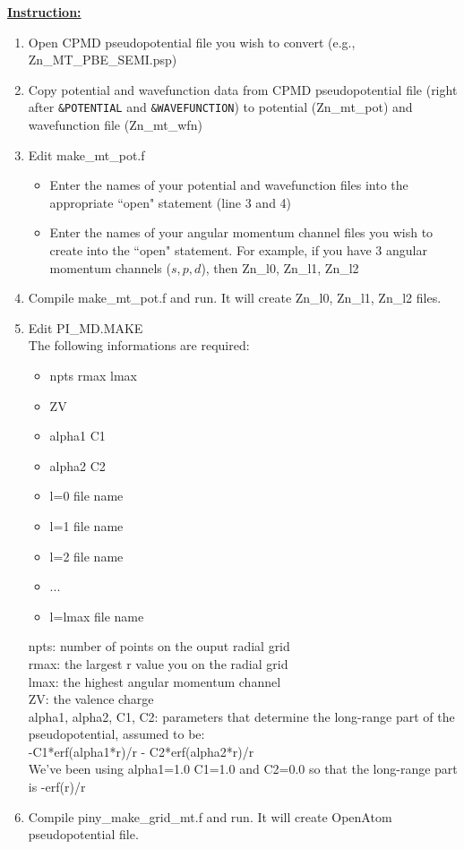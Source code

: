 \vskip 12pt
\noindent
\underline{ {\bf Instruction:} }

\begin{enumerate}
\item Open CPMD pseudopotential file you wish to convert (e.g., Zn\_MT\_PBE\_SEMI.psp)
\item  Copy potential and wavefunction data from CPMD pseudopotential file (right after \verb+&POTENTIAL+ and \verb+&WAVEFUNCTION+) to potential (Zn{\_}mt{\_}pot) and wavefunction file (Zn\_mt\_wfn)
\item Edit make{\_}mt{\_}pot.f

        \begin{itemize}
	\item Enter the names of your potential and wavefunction files into the appropriate ``open" statement (line 3 and 4)
	\item Enter the names of your angular momentum channel files  you wish to create into the ``open" statement. 
	For example, if you have 3 angular momentum channels ($s, p, d$), then Zn{\_}l0, Zn{\_}l1, Zn{\_}l2
         \end{itemize}

\item Compile make{\_}mt{\_}pot.f and run. It will create Zn{\_}l0, Zn{\_}l1, Zn{\_}l2 files.

\item Edit PI{\_}MD.MAKE\\ The following informations are required:

	\begin{itemize}
	\item npts rmax lmax
	\item ZV
	\item alpha1 C1
	\item alpha2 C2
	\item l=0 file name 
	\item l=1 file name 
	\item l=2 file name 
	\item...
	\item l=lmax file name
	\end{itemize}
	
	npts: number of points on the ouput radial grid\\
	rmax: the largest r value you on the radial grid\\
	lmax: the highest angular momentum channel\\
	ZV: the valence charge\\
	alpha1, alpha2, C1, C2: parameters that determine the long-range part of the pseudopotential, assumed to be:\\
	
	-C1*erf(alpha1*r)/r - C2*erf(alpha2*r)/r\\
	
	We've been using alpha1=1.0 C1=1.0 and C2=0.0 so that the long-range part is -erf(r)/r

\item Compile piny{\_}make{\_}grid{\_}mt.f and run. It will create OpenAtom pseudopotential file.
\end{enumerate}



